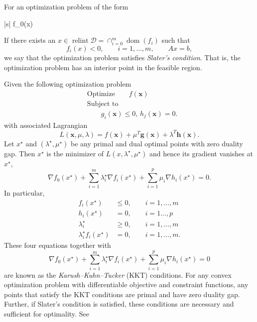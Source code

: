 \documentclass[11pt, letterpaper,nounbold]{article}
\begin{document}
\begin{defn}
For an optimization problem of the form 
	\begin{mini*}|s|
		{}{f_{0}(x)}{}{}
	\end{mini*}
If there exists an $x\in \operatorname{relint}\mathcal{D} = \cap_{i=0}^{m} \operatorname{dom}(f_{i})$ such that
	\[f_{i}(x) < 0, \qquad i = 1,\dots, m, \qquad Ax = b,\]
we say that the optimization problem satisfies \emph{Slater's condition}. That is, the optimization problem has an interior point in the feasible region. 
\end{defn}
\begin{theorem}
Given the following optimization problem 
	\begin{align*}
		&\text{Optimize}\qquad  f(\mathbf{x})\\
		&\text{Subject to}\\
		&\qquad g_{i}(\mathbf{x})\leq 0,\,  h_{j}(\mathbf{x}) = 0.
	\end{align*}
with associated Lagrangian
	\[L(\mathbf{x}, \mu,\lambda) = f(\mathbf{x}) + \mu^{T}\mathbf{g(x)} + \lambda^{T}\mathbf{h(x)}.\]
Let $x^{\star}$ and $(\lambda^{\star}, \mu^{\star})$ be any primal and dual optimal points with zero duality gap. Then $x^{\star}$ is the minimizer of $L(x, \lambda^{\star}, \mu^{\star})$ and hence its gradient vanishes at $x^{\star}$,
	\[\nabla f_{0}(x^{\star}) + \sum_{i=1}^{m} \lambda_{i}^{\star} \nabla f_{i}(x^{\star}) + \sum_{i=1}^{p}\mu_{i}\nabla h_{i}(x^{\star}) = 0.\]	
In particular,
	\begin{align*}
		f_{i}(x^{\star}) &\leq 0,\qquad  i = 1, \dots, m\\
		h_{i}(x^{\star}) &= 0,\qquad  i = 1\dots, p\\
		\lambda_{i}^{\star} &\geq 0,\qquad  i = 1,\dots, m\\
		\lambda_{i}^{\star}f_{i}(x^{\star}) &= 0,\qquad  i = 1,\dots, m.
	\end{align*}
These four equations together with 
	\[\nabla f_{0}(x^{\star}) + \sum_{i=1}^{m} \lambda_{i}^{\star} \nabla f_{i}(x^{\star}) + \sum_{i=1}^{p}\mu_{i}\nabla h_{i}(x^{\star}) = 0\]
are known as the \emph{Karush--Kuhn--Tucker} (KKT) conditions. For any convex optimization problem with differentiable objective and constraint functions, any points that satisfy the KKT conditions are primal and have zero duality gap. Further, if Slater's condition is satisfied, these conditions are necessary and sufficient for optimality. See \cite[Ch.~5]{Boyd2009}
\end{theorem}
\end{document}

